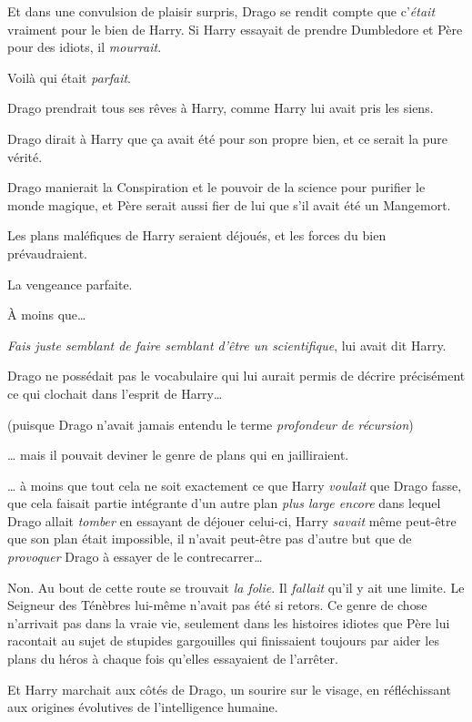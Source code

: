 Et dans une convulsion de plaisir surpris, Drago se rendit compte que c'\emph{était} vraiment pour le bien de Harry. Si Harry essayait de prendre Dumbledore et Père pour des idiots, il \emph{mourrait}.

Voilà qui était \emph{parfait}.

Drago prendrait tous ses rêves à Harry, comme Harry lui avait pris les siens.

Drago dirait à Harry que ça avait été pour son propre bien, et ce serait la pure vérité.

Drago manierait la Conspiration et le pouvoir de la science pour purifier le monde magique, et Père serait aussi fier de lui que s'il avait été un Mangemort.

Les plans maléfiques de Harry seraient déjoués, et les forces du bien prévaudraient.

La vengeance parfaite.

À moins que…

\emph{Fais juste semblant de faire semblant d'être un scientifique}, lui avait dit Harry.

Drago ne possédait pas le vocabulaire qui lui aurait permis de décrire précisément ce qui clochait dans l'esprit de Harry…

(puisque Drago n'avait jamais entendu le terme \emph{profondeur de récursion})

… mais il pouvait deviner le genre de plans qui en jailliraient.

… à moins que tout cela ne soit exactement ce que Harry \emph{voulait} que Drago fasse, que cela faisait partie intégrante d'un autre plan \emph{plus large encore} dans lequel Drago allait \emph{tomber} en essayant de déjouer celui-ci, Harry \emph{savait} même peut-être que son plan était impossible, il n'avait peut-être pas d'autre but que de \emph{provoquer} Drago à essayer de le contrecarrer…

Non. Au bout de cette route se trouvait \emph{la folie}. Il \emph{fallait} qu'il y ait une limite. Le Seigneur des Ténèbres lui-même n'avait pas été si retors. Ce genre de chose n'arrivait pas dans la vraie vie, seulement dans les histoires idiotes que Père lui racontait au sujet de stupides gargouilles qui finissaient toujours par aider les plans du héros à chaque fois qu'elles essayaient de l'arrêter.

\later

Et Harry marchait aux côtés de Drago, un sourire sur le visage, en réfléchissant aux origines évolutives de l'intelligence humaine.

